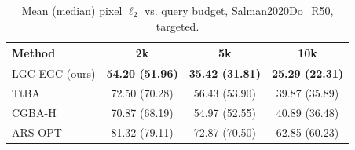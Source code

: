 \begin{table}[t]
\centering\footnotesize
\caption{Mean (median) pixel $\ell_2$ vs. query budget, Salman2020Do\_R50, targeted.}
\begin{tabular}{lccc}
\toprule
Method & 2k & 5k & 10k \\
\midrule
LGC-EGC (ours) & \textbf{54.20 (51.96)} & \textbf{35.42 (31.81)} & \textbf{25.29 (22.31)} \\
TtBA & 72.50 (70.28) & 56.43 (53.90) & 39.87 (35.89) \\
CGBA-H & 70.87 (68.19) & 54.97 (52.55) & 40.89 (36.48) \\
ARS-OPT & 81.32 (79.11) & 72.87 (70.50) & 62.85 (60.23) \\
\bottomrule
\end{tabular}
\end{table}
